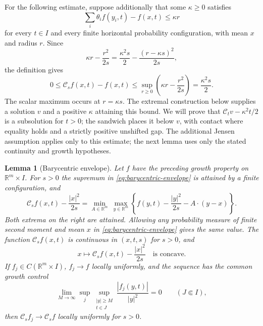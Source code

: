 \documentclass[11pt]{article}
\numberwithin{equation}{section}
\newtheorem{lemma}[theorem]{Lemma}
\theoremstyle{definition}
\theoremstyle{remark}
\newcommand{\R}{\mathbb{R}}
\newcommand{\Cenv}{\mathcal{C}}
\begin{document}
For the following estimate, suppose additionally that some $\kappa\ge0$
satisfies
\begin{equation}\label{eq:jensen-bound}
  \sum_i\theta_i f(y_i,t)-f(x,t)\le\kappa r
\end{equation}
for every $t\in I$ and every finite horizontal probability
configuration, with mean $x$ and radius $r$. Since
\[
  \kappa r-\frac{r^2}{2s}
   =\frac{\kappa^2s}{2}-\frac{(r-\kappa s)^2}{2s},
\]
the definition gives
\begin{equation}\label{eq:barycentric-sandwich}
  0\le\Cenv_s f(x,t)-f(x,t)
     \le\sup_{r\ge0}\left(\kappa r-\frac{r^2}{2s}\right)
     =\frac{\kappa^2s}{2}.
\end{equation}
The scalar maximum occurs at $r=\kappa s$. The extremal construction
below supplies a solution $v$ and a positive $\kappa$ attaining this bound.
We will prove that $\Cenv_t v-\kappa^2t/2$ is a subsolution for $t>0$;
the sandwich places it below $v$, with contact where equality holds and
a strictly positive unshifted gap.
The additional Jensen assumption applies only to this estimate; the next
lemma uses only the stated continuity and growth hypotheses.

\begin{lemma}[Barycentric envelope]\label{lem:barycentric-envelope}
Let $f$ have the preceding growth property on $\R^m\times I$.
For $s>0$ the supremum in \eqref{eq:barycentric-envelope} is
attained by a finite configuration, and
\begin{equation}\label{eq:barycentric-duality}
  \Cenv_s f(x,t)-\frac{|x|^2}{2s}
   =\min_{A\in\R^m}\ \max_{y\in\R^m}
       \left\{f(y,t)-\frac{|y|^2}{2s}-A\cdot(y-x)\right\}.
\end{equation}
Both extrema on the right are attained. Allowing any probability
measure of finite second moment and mean $x$ in
\eqref{eq:barycentric-envelope} gives the same value.
The function $\Cenv_s f(x,t)$ is continuous in $(x,t,s)$ for
$s>0$, and
\begin{equation}\label{eq:barycentric-semiconcavity}
  x\longmapsto\Cenv_s f(x,t)-\frac{|x|^2}{2s}
       \quad\text{is concave}.
\end{equation}
If $f_j\in C(\R^m\times I)$, $f_j\to f$ locally uniformly, and the sequence has the common
growth control
\[
  \lim_{M\to\infty}
  \sup_j\sup_{\substack{|y|\ge M\\t\in J}}
       \frac{|f_j(y,t)|}{|y|^2}=0
       \qquad(J\Subset I),
\]
then $\Cenv_s f_j\to\Cenv_s f$ locally uniformly for $s>0$.
\end{lemma}
\end{document}
